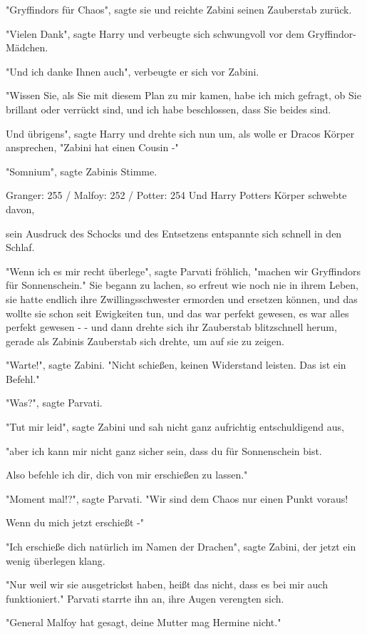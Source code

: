 {"Gryffindors für Chaos", sagte sie und reichte Zabini seinen Zauberstab zurück.

"Vielen Dank", sagte Harry und verbeugte sich schwungvoll vor dem Gryffindor-Mädchen.

"Und ich danke Ihnen auch", verbeugte er sich vor Zabini.

"Wissen Sie, als Sie mit diesem Plan zu mir kamen, habe ich mich gefragt, ob Sie brillant oder verrückt sind, und ich habe beschlossen, dass Sie beides sind.

Und übrigens", sagte Harry und drehte sich nun um, als wolle er Dracos Körper ansprechen, "Zabini hat einen Cousin -"

"Somnium", sagte Zabinis Stimme.

Granger: 255 / Malfoy: 252 / Potter: 254 Und Harry Potters Körper schwebte davon,

sein Ausdruck des Schocks und des Entsetzens entspannte sich schnell in den Schlaf.

"Wenn ich es mir recht überlege", sagte Parvati fröhlich, "machen wir Gryffindors für Sonnenschein." Sie begann zu lachen, so erfreut wie noch nie in ihrem Leben, sie hatte endlich ihre Zwillingsschwester ermorden und ersetzen können, und das wollte sie schon seit Ewigkeiten tun, und das war perfekt gewesen, es war alles perfekt gewesen - - und dann drehte sich ihr Zauberstab blitzschnell herum, gerade als Zabinis Zauberstab sich drehte, um auf sie zu zeigen.

"Warte!", sagte Zabini. "Nicht schießen, keinen Widerstand leisten. Das ist ein Befehl."

"Was?", sagte Parvati.

"Tut mir leid", sagte Zabini und sah nicht ganz aufrichtig entschuldigend aus,

"aber ich kann mir nicht ganz sicher sein, dass du für Sonnenschein bist.

Also befehle ich dir, dich von mir erschießen zu lassen."

"Moment mal!?", sagte Parvati. "Wir sind dem Chaos nur einen Punkt voraus!

Wenn du mich jetzt erschießt -"

"Ich erschieße dich natürlich im Namen der Drachen", sagte Zabini, der jetzt ein wenig überlegen klang.

"Nur weil wir sie ausgetrickst haben, heißt das nicht, dass es bei mir auch funktioniert." Parvati starrte ihn an, ihre Augen verengten sich.

"General Malfoy hat gesagt, deine Mutter mag Hermine nicht."

}

